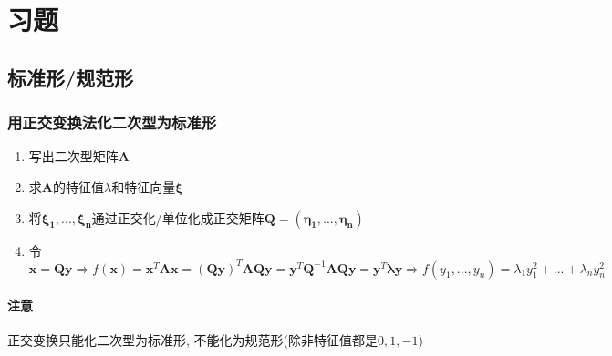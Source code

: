 \section{习题}
\subsection{标准形/规范形}
\subsubsection{用正交变换法化二次型为标准形}
\begin{enumerate}\label{ref:求标准形}
\item 写出二次型矩阵$ \bm{A} $
\item 求$ \bm{A} $的特征值$ \lambda $和特征向量$ \bm{\xi} $
\item 将$ \bm{\xi_{1}},..., \bm{\xi_{n}} $通过正交化/单位化成正交矩阵$ \bm{Q}=(\bm{\eta_{1}},..., \bm{\eta_{n}}) $
\item 令$ \bm{x}=\bm{Q}\bm{y}\Rightarrow f(\bm{x})=\bm{x}^{T}\bm{A}\bm{x}=(\bm{Q}\bm{y})^{T}\bm{A}\bm{Q}\bm{y}=\bm{y}^{T}\bm{Q}^{-1}\bm{A}\bm{Q}\bm{y}=\bm{y}^{T}\bm{\lambda}\bm{y}\Rightarrow f(y_{1},..., y_{n})=\lambda_{1}y_{1}^{2}+... +\lambda_{n}y_{n}^{2} $ 
\end{enumerate}
\paragraph{注意} 正交变换只能化二次型为标准形, 不能化为规范形(除非特征值都是$ 0, 1, -1 $)